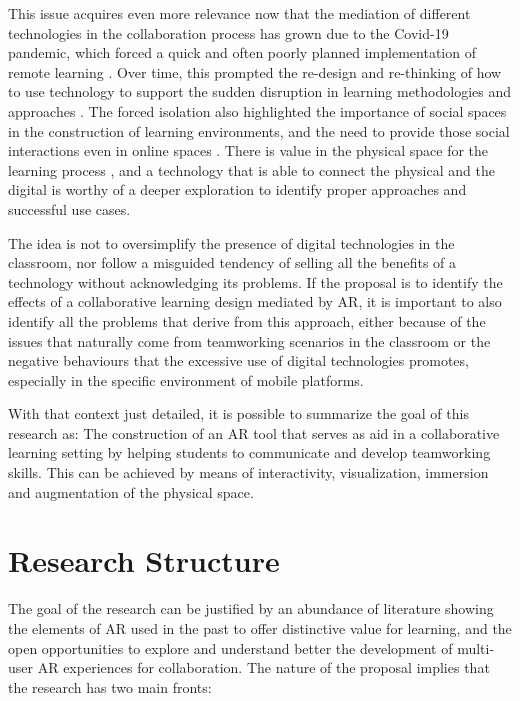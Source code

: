 This issue acquires even more relevance now that the mediation of different technologies in the collaboration process has grown due to the Covid-19 pandemic,
which forced a quick and often poorly planned implementation of remote learning \parencite{drueke_2021,nuere_2021}. Over time, this prompted the re-design
and re-thinking of how to use technology to support the sudden disruption in learning methodologies and approaches \parencite{fischer_2020,adi_2020}. The
forced isolation also highlighted the importance of social spaces in the construction of learning environments, and the need to provide those social
interactions even in online spaces \parencite{walas-trebacz_2025,mcinnerney_2004}. There is value in the physical space for the learning process \parencite{petchame_2021,thai_2020,paechter_2010},
and a technology that is able to connect the physical and the digital is worthy of a deeper exploration to identify proper approaches and successful use cases.

The idea is not to oversimplify the presence of digital technologies in the classroom, nor follow a misguided tendency of selling all the benefits of a
technology without acknowledging its problems. If the proposal is to identify the effects of a collaborative learning design mediated by \ac{AR}, it is
important to also identify all the problems that derive from this approach, either because of the issues that naturally come from teamworking scenarios in
the classroom or the negative behaviours that the excessive use of digital technologies promotes, especially in the specific environment of mobile platforms.

With that context just detailed, it is possible to summarize the goal of this research as: The construction of an \ac{AR} tool that serves as aid in a
collaborative learning setting by helping students to communicate and develop teamworking skills. This can be achieved by means of interactivity,
visualization, immersion and augmentation of the physical space.

\section{Research Structure \label{sec:1-2}}

The goal of the research can be justified by an abundance of literature showing the elements of \ac{AR} used in the past to offer distinctive value for
learning, and the open opportunities to explore and understand better the development of multi-user \ac{AR} experiences for collaboration. The nature of the
proposal implies that the research has two main fronts:

